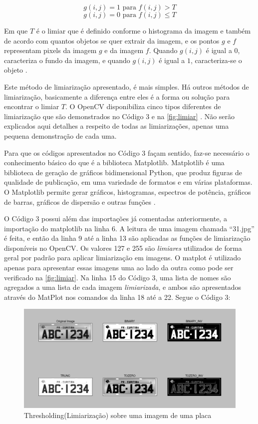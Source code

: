 \[
g(i,j) = 1 \mbox{~para~} f(i,j) > T 
\]
\[
g(i,j) = 0 \mbox{~para~} f(i,j) \leq T
\]

Em que $T$ é o limiar que é definido conforme o histograma da imagem e também de acordo com quantos objetos se quer extrair da imagem, e os pontos $g$ e $f$ representam pixels da imagem $g$ e da imagem $f$. Quando $g(i,j)$ é igual a $0$, caracteriza o fundo da imagem, e quando $g(i,j)$ é igual a $1$, caracteriza-se o objeto \cite{sonka2014image}.

Este método de limiarização apresentado, é mais simples. Há outros métodos de limiarização, basicamente a diferença entre eles é a forma ou solução para encontrar o limiar $T$. O OpenCV disponibiliza cinco tipos diferentes de limiarização que são demonstrados no Código 3 e na \autoref{fig:limiar} \cite{opencv}. Não serão explicados aqui detalhes a respeito de todas as limiarizações, apenas uma pequena demonstração de cada uma. 

Para que os códigos apresentados no Código 3 façam sentido, faz-se necessário o conhecimento básico do que é a biblioteca Matplotlib. Matplotlib é uma biblioteca de geração de gráficos bidimensional Python, que produz figuras de qualidade de publicação, em uma variedade de formatos e em várias plataformas. O Matplotlib permite gerar gráficos, histogramas, espectros de potência, gráficos de barras, gráficos de dispersão e outras funções \cite{Hunter:2007}. 

O Código 3 possui além das importações já comentadas anteriormente, a importação do matplotlib na linha 6. A leitura de uma imagem chamada ``31.jpg'' é feita, e então da linha 9 até a linha 13 são aplicadas as funções de limiarização disponíveis no OpenCV. Os valores 127 e 255 são \textit{limiares} utilizados de forma geral por padrão para aplicar limiarização em imagens. O matplot é utilizado apenas para apresentar essas imagens uma ao lado da outra como pode ser verificado na \autoref{fig:limiar}. Na linha 15 do Código 3, uma lista de nomes são agregados a uma lista de cada imagem \textit{limiarizada}, e ambos são apresentados através do MatPlot nos comandos da linha 18 até a 22. Segue o Código 3:



\begin{figure}[htbp]
\caption{\label{fig:limiar}Thresholding(Limiarização) sobre uma imagem de uma placa}
\begin{center}
	\includegraphics[width=.9\textwidth]{figuras/f2c3.png}
\end{center}
\end{figure} 
 
